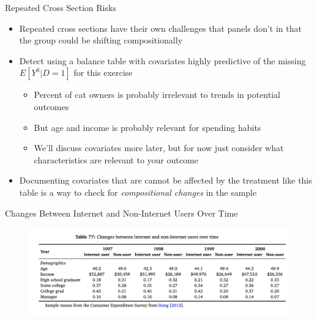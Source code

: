 \documentclass{beamer}
\begin{document}
\begin{frame}{Repeated Cross Section Risks}

\begin{itemize}
\item Repeated cross sections have their own challenges that panels don't in that the group could be shifting compositionally
\item Detect using a balance table with covariates highly predictive of the missing $E[Y^0|D=1]$ for this exercise
	\begin{itemize}
	\item Percent of cat owners is probably irrelevant to trends in potential outcomes
	\item But age and income is probably relevant for spending habits
	\item We'll discuss covariates more later, but for now just consider what characteristics are relevant to your outcome
	\end{itemize}
\item Documenting covariates that are cannot be affected by the treatment like this table is a way to check for \emph{compositional changes} in the sample
\end{itemize}

\end{frame}


\begin{frame}{Changes Between Internet and Non-Internet Users Over Time}

	\begin{figure}
	\includegraphics[scale=0.5]{./lecture_includes/hong_table.png}
	\end{figure}



\end{frame}
\end{document}
